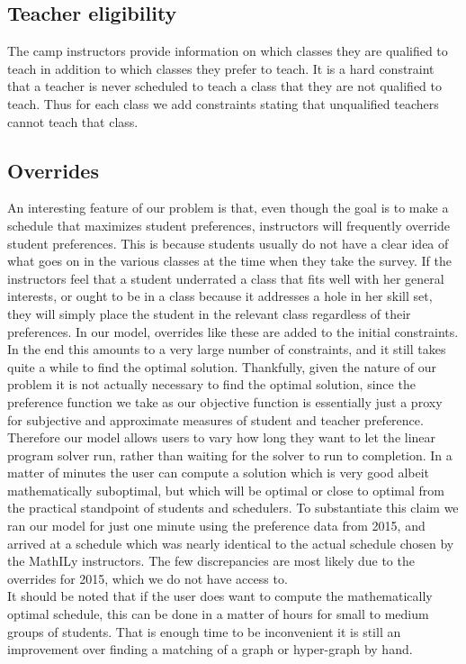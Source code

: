 \documentclass[11pt]{article}
\begin{document}
\subsection{Teacher eligibility}
The camp instructors provide information on which classes they are qualified to teach in addition to which classes they prefer to teach. It is a hard constraint that a teacher is never scheduled to teach a class that they are not qualified to teach. Thus for each class we add constraints stating that unqualified teachers cannot teach that class.
	\subsection{Overrides}
An interesting feature of our problem is that, even though the goal is to make a schedule that maximizes student preferences, instructors will frequently override student preferences. This is because students usually do not have a clear idea of what goes on in the various classes at the time when they take the survey. If the instructors feel that a student underrated a class that fits well with her general interests, or ought to be in a class because it addresses a hole in her skill set, they will simply place the student in the relevant class regardless of their preferences. In our model, overrides like these are added to the initial constraints.\\

	In the end this amounts to a very large number of constraints, and it still takes quite a while to find the optimal solution. Thankfully, given the nature of our problem it is not actually necessary to find the optimal solution, since the preference function we take as our objective function is essentially just a proxy for subjective and approximate measures of student and teacher preference. Therefore our model allows users to vary how long they want to let the linear program solver run, rather than waiting for the solver to run to completion. In a matter of minutes the user can compute a solution which is very good albeit mathematically suboptimal, but which will be optimal or close to optimal from the practical standpoint of students and schedulers. To substantiate this claim we ran our model for just one minute using the preference data from 2015, and arrived at a schedule which was nearly identical to the actual schedule chosen by the MathILy instructors. The few discrepancies are most likely due to the overrides for 2015, which we do not have access to.\\
\indent It should be noted that if the user does want to compute the mathematically optimal schedule, this can be done in a matter of hours for small to medium groups of students.  That is enough time to be inconvenient it is still an improvement over finding a matching of a graph or hyper-graph by hand.
\end{document}
